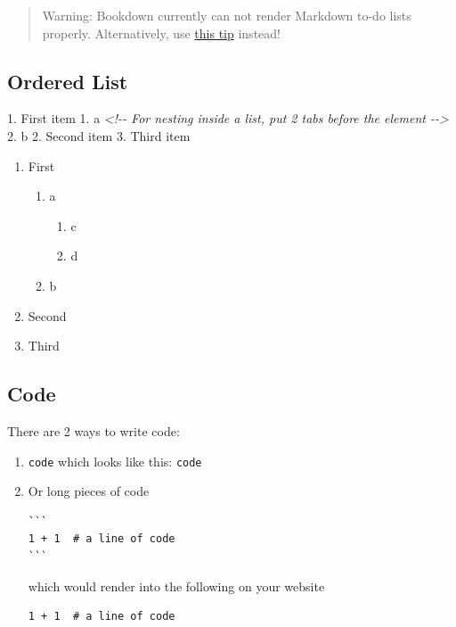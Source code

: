 \documentclass[
]{book}
\newenvironment{Shaded}{\begin{snugshade}}{\end{snugshade}}
\newcommand{\CommentTok}[1]{\textcolor[rgb]{0.56,0.35,0.01}{\textit{#1}}}
\newcommand{\NormalTok}[1]{#1}
\newcommand{\SpecialStringTok}[1]{\textcolor[rgb]{0.31,0.60,0.02}{#1}}
\providecommand{\tightlist}{%
  \setlength{\itemsep}{0pt}\setlength{\parskip}{0pt}}
\theoremstyle{definition}
\theoremstyle{definition}
\theoremstyle{definition}
\theoremstyle{definition}
\theoremstyle{remark}
\begin{document}
\begin{quote}
Warning: Bookdown currently can not render Markdown to-do lists properly. Alternatively, use \hyperref[use-html]{this tip} instead!
\end{quote}

\subsection*{Ordered List}\label{ordered-list}

\begin{Shaded}
\begin{Highlighting}[]
\SpecialStringTok{1. }\NormalTok{First item}
\SpecialStringTok{    1. }\NormalTok{a }\CommentTok{\textless{}!{-}{-} For nesting inside a list, put 2 tabs before the element {-}{-}\textgreater{}}
\SpecialStringTok{    2. }\NormalTok{b}
\SpecialStringTok{2. }\NormalTok{Second item}
\SpecialStringTok{3. }\NormalTok{Third item}
\end{Highlighting}
\end{Shaded}

\begin{enumerate}
\def\labelenumi{\arabic{enumi}.}
\tightlist
\item
  First

  \begin{enumerate}
  \def\labelenumii{\arabic{enumii}.}
  \tightlist
  \item
    a

    \begin{enumerate}
    \def\labelenumiii{\arabic{enumiii}.}
    \tightlist
    \item
      c
    \item
      d
    \end{enumerate}
  \item
    b
  \end{enumerate}
\item
  Second
\item
  Third
\end{enumerate}

\subsection*{Code}\label{code}

There are 2 ways to write code:

\begin{enumerate}
\def\labelenumi{\arabic{enumi}.}
\item
  \texttt{\textasciigrave{}code\textasciigrave{}} which looks like this: \texttt{code}
\item
  Or long pieces of code

\begin{verbatim}
```
1 + 1  # a line of code
```
\end{verbatim}

  which would render into the following on your website

\begin{verbatim}
1 + 1  # a line of code
\end{verbatim}
\end{enumerate}
\end{document}

